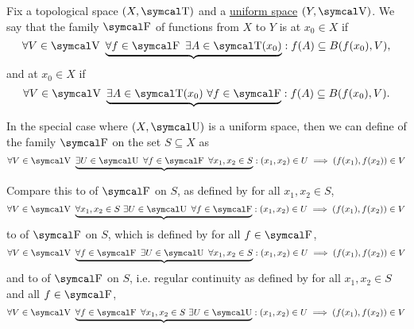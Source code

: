 \begin{definition}\label{def:function_set_continuity}
  Fix a topological space \( (X, \CT) \) and a \hyperref[def:uniform_space]{uniform space} \( (Y, \CV) \). We say that the family \( \CF \) of functions from \( X \) to \( Y \) is  at \( x_0 \in X \) if
  \begin{equation}\label{def:function_set_continuity/functionwise}
    \forall V \in \CV \ \underbrace{\forall f \in \CF \ \exists A \in \CT(x_0)} : f(A) \subseteq B(f(x_0), V),
  \end{equation}
  and  at \( x_0 \in X \) if
  \begin{equation}\label{def:function_set_continuity/equicontinuous}
    \forall V \in \CV \ \underbrace{\exists A \in \CT(x_0) \ \forall f \in \CF} : f(A) \subseteq B(f(x_0), V).
  \end{equation}

  In the special case where \( (X, \CU) \) is a uniform space, then we can define  of the family \( \CF \) on the set \( S \subseteq X \) as
  \begin{equation}\label{def:function_set_continuity/uniform_equicontinuous}
    \forall V \in \CV \ \underbrace{\exists U \in \CU \ \forall f \in \CF \ \forall x_1, x_2 \in S} : (x_1, x_2) \in U \implies (f(x_1), f(x_2)) \in V
  \end{equation}

  Compare this to  of \( \CF \) on \( S \), as defined by  for all \( x_1, x_2 \in S \),
  \begin{equation}\label{def:function_set_continuity/pointwise_equicontinuous}
    \forall V \in \CV \ \underbrace{\forall x_1, x_2 \in S \ \exists U \in \CU \ \forall f \in \CF} : (x_1, x_2) \in U \implies (f(x_1), f(x_2)) \in V
  \end{equation}
  to  of \( \CF \) on \( S \), which is defined by  for all \( f \in \CF \),
  \begin{equation}\label{def:function_set_continuity/uniform_functionwise}
    \forall V \in \CV \ \underbrace{\forall f \in \CF \ \exists U \in \CU \ \forall x_1, x_2 \in S} : (x_1, x_2) \in U \implies (f(x_1), f(x_2)) \in V
  \end{equation}
  and to  of \( \CF \) on \( S \), i.e. regular continuity as defined by  for all \( x_1, x_2 \in S \) and all \( f \in \CF \),
  \begin{equation}\label{def:function_set_continuity/functionwise_pointwise}
    \forall V \in \CV \ \underbrace{\forall f \in \CF \ \forall x_1, x_2 \in S \ \exists U \in \CU} : (x_1, x_2) \in U \implies (f(x_1), f(x_2)) \in V
  \end{equation}
\end{definition}

